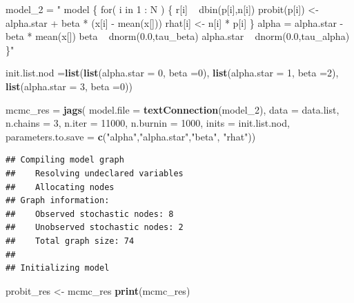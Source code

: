 \documentclass[]{article}
\newenvironment{Shaded}{\begin{snugshade}}{\end{snugshade}}
\newcommand{\DataTypeTok}[1]{\textcolor[rgb]{0.13,0.29,0.53}{#1}}
\newcommand{\DecValTok}[1]{\textcolor[rgb]{0.00,0.00,0.81}{#1}}
\newcommand{\KeywordTok}[1]{\textcolor[rgb]{0.13,0.29,0.53}{\textbf{#1}}}
\newcommand{\NormalTok}[1]{#1}
\newcommand{\StringTok}[1]{\textcolor[rgb]{0.31,0.60,0.02}{#1}}
\begin{document}
\begin{Shaded}
\begin{Highlighting}[]
\NormalTok{model_}\DecValTok{2}\NormalTok{ =}\StringTok{ "}
\StringTok{      model \{}
\StringTok{       for( i in 1 : N ) \{}
\StringTok{          r[i] ~ dbin(p[i],n[i])}
\StringTok{          probit(p[i]) <- alpha.star + beta * (x[i] - mean(x[]))}
\StringTok{          rhat[i] <- n[i] * p[i]}
\StringTok{       \}}
\StringTok{       alpha = alpha.star - beta * mean(x[])}
\StringTok{       beta ~ dnorm(0.0,tau_beta)}
\StringTok{       alpha.star ~ dnorm(0.0,tau_alpha)   }
\StringTok{    \}"}

\NormalTok{init.list.nod =}\KeywordTok{list}\NormalTok{(}\KeywordTok{list}\NormalTok{(}\DataTypeTok{alpha.star =} \DecValTok{0}\NormalTok{, }\DataTypeTok{beta =}\DecValTok{0}\NormalTok{),}
                    \KeywordTok{list}\NormalTok{(}\DataTypeTok{alpha.star =} \DecValTok{1}\NormalTok{, }\DataTypeTok{beta =}\DecValTok{2}\NormalTok{),}
                    \KeywordTok{list}\NormalTok{(}\DataTypeTok{alpha.star =} \DecValTok{3}\NormalTok{, }\DataTypeTok{beta =}\DecValTok{0}\NormalTok{))}

\NormalTok{mcmc_res =}\StringTok{ }\KeywordTok{jags}\NormalTok{( }\DataTypeTok{model.file =} \KeywordTok{textConnection}\NormalTok{(model_}\DecValTok{2}\NormalTok{),}
                  \DataTypeTok{data =}\NormalTok{ data.list, }
                  \DataTypeTok{n.chains =} \DecValTok{3}\NormalTok{, }
                  \DataTypeTok{n.iter =} \DecValTok{11000}\NormalTok{, }
                  \DataTypeTok{n.burnin =} \DecValTok{1000}\NormalTok{,}
                  \DataTypeTok{inits =}\NormalTok{ init.list.nod, }
                  \DataTypeTok{parameters.to.save =} \KeywordTok{c}\NormalTok{(}\StringTok{"alpha"}\NormalTok{,}\StringTok{"alpha.star"}\NormalTok{,}\StringTok{"beta"}\NormalTok{, }\StringTok{"rhat"}\NormalTok{))}
\end{Highlighting}
\end{Shaded}

\begin{verbatim}
## Compiling model graph
##    Resolving undeclared variables
##    Allocating nodes
## Graph information:
##    Observed stochastic nodes: 8
##    Unobserved stochastic nodes: 2
##    Total graph size: 74
## 
## Initializing model
\end{verbatim}

\begin{Shaded}
\begin{Highlighting}[]
\NormalTok{probit_res <-}\StringTok{ }\NormalTok{mcmc_res}
\KeywordTok{print}\NormalTok{(mcmc_res)}
\end{Highlighting}
\end{Shaded}
\end{document}
